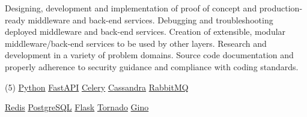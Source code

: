 \documentclass[10pt,a4paper]{altacv}
\begin{document}

\begin{fullwidth}
\makecvheader
\end{fullwidth}





Designing, development and implementation of proof of concept and production-ready middleware and back-end services.
Debugging and troubleshooting deployed middleware and back-end services.
Creation of extensible, modular middleware/back-end services to be used by other layers.
Research and development in a variety of problem domains.
Source code documentation and properly adherence to security guidance and compliance with coding standards.




\vspace{-0.5mm}
\begin{tasks}[label-offset=0.5mm, item-indent=5.0mm, label-align=left, label={\scriptsize\faCode}, label-format={\scriptsize\color{tech}}, item-format={\bfseries\footnotesize\color{emphasis}}](5)
	\task \href{https://www.python.org/}{Python}
	\task \href{https://fastapi.tiangolo.com/}{FastAPI}
	\task \href{https://docs.celeryq.dev/en/stable/}{Celery}
	\task \href{https://cassandra.apache.org/}{Cassandra}
	\task \href{https://www.rabbitmq.com/}{RabbitMQ}

	\task \href{https://redis.io/}{Redis}
	\task \href{https://www.postgresql.org/}{PostgreSQL}
	\task \href{https://flask.palletsprojects.com/en/2.2.x/}{Flask}
	\task \href{https://www.tornadoweb.org/en/stable/}{Tornado}
	\task \href{https://python-gino.org/}{Gino}
\end{tasks}
\end{document}
